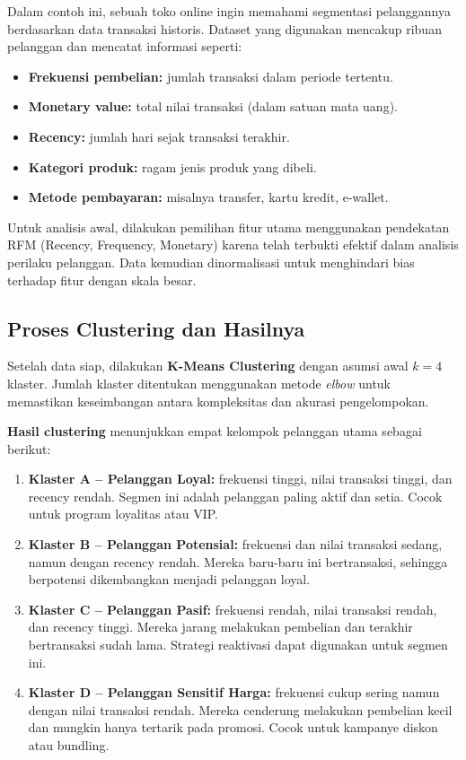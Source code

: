 Dalam contoh ini, sebuah toko online ingin memahami segmentasi pelanggannya berdasarkan data transaksi historis. Dataset yang digunakan mencakup ribuan pelanggan dan mencatat informasi seperti:

\begin{itemize}
	\item \textbf{Frekuensi pembelian:} jumlah transaksi dalam periode tertentu.
	\item \textbf{Monetary value:} total nilai transaksi (dalam satuan mata uang).
	\item \textbf{Recency:} jumlah hari sejak transaksi terakhir.
	\item \textbf{Kategori produk:} ragam jenis produk yang dibeli.
	\item \textbf{Metode pembayaran:} misalnya transfer, kartu kredit, e-wallet.
\end{itemize}

Untuk analisis awal, dilakukan pemilihan fitur utama menggunakan pendekatan RFM (Recency, Frequency, Monetary) karena telah terbukti efektif dalam analisis perilaku pelanggan. Data kemudian dinormalisasi untuk menghindari bias terhadap fitur dengan skala besar.

\subsection*{Proses Clustering dan Hasilnya}

Setelah data siap, dilakukan \textbf{K-Means Clustering} dengan asumsi awal \( k = 4 \) klaster. Jumlah klaster ditentukan menggunakan metode \textit{elbow} untuk memastikan keseimbangan antara kompleksitas dan akurasi pengelompokan.

\textbf{Hasil clustering} menunjukkan empat kelompok pelanggan utama sebagai berikut:

\begin{enumerate}
	\item \textbf{Klaster A – Pelanggan Loyal:} frekuensi tinggi, nilai transaksi tinggi, dan recency rendah. Segmen ini adalah pelanggan paling aktif dan setia. Cocok untuk program loyalitas atau VIP.
	
	\item \textbf{Klaster B – Pelanggan Potensial:} frekuensi dan nilai transaksi sedang, namun dengan recency rendah. Mereka baru-baru ini bertransaksi, sehingga berpotensi dikembangkan menjadi pelanggan loyal.
	
	\item \textbf{Klaster C – Pelanggan Pasif:} frekuensi rendah, nilai transaksi rendah, dan recency tinggi. Mereka jarang melakukan pembelian dan terakhir bertransaksi sudah lama. Strategi reaktivasi dapat digunakan untuk segmen ini.
	
	\item \textbf{Klaster D – Pelanggan Sensitif Harga:} frekuensi cukup sering namun dengan nilai transaksi rendah. Mereka cenderung melakukan pembelian kecil dan mungkin hanya tertarik pada promosi. Cocok untuk kampanye diskon atau bundling.
\end{enumerate}


